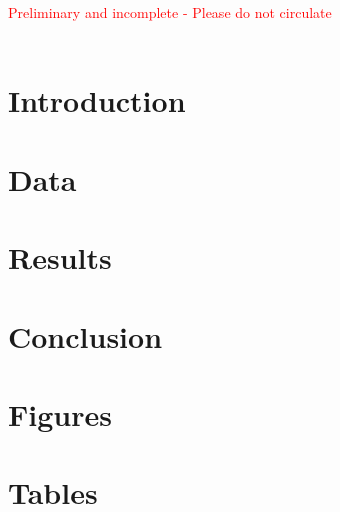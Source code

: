 \documentclass[12pt]{article}
\begin{document}
\maketitle
\thispagestyle{empty}

\begin{center}  \textcolor{red}{\large Preliminary and incomplete - Please do not circulate \\ ~ }

\end{center}

\begin{abstract}
  \iflongabs{\abslong}{\abs}
\end{abstract}
\cleardoublepage

\doublespacing

\setcounter{page}{1}




\section{Introduction}
\label{sec:Intro}



\section{Data}
\label{sec:Data}



\section{Results}
\label{sec:Results}



\section{Conclusion}
\label{sec:Conclusion}



\pagebreak
\singlespacing

\label{sec:Lit}

{}

\clearpage

 \section*{Figures}
 	
 \label{app:Figures}

\section*{Tables}
\label{app:Tables}



 \clearpage 
 \appendix
 
\end{document}
